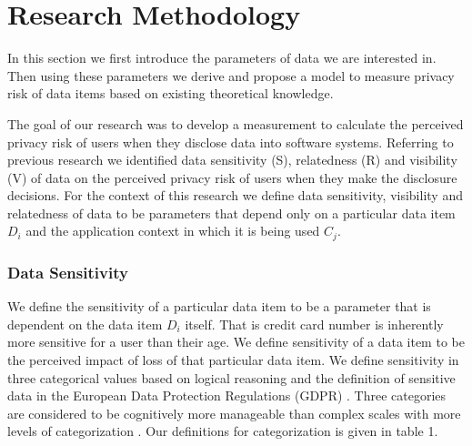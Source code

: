 \documentclass[10pt]{article}
\begin{document}
\section {Research Methodology}

In this section we first introduce the parameters of data we are interested in. Then using these parameters we derive and propose a model to measure privacy risk of data items based on existing theoretical knowledge.

The goal of our research was to develop a measurement to calculate the perceived privacy risk of users when they disclose data into software systems. Referring to previous research we identified data sensitivity (S), relatedness (R) and visibility (V) of data on the perceived privacy risk of users when they make the disclosure decisions. For the context of this research we define data sensitivity, visibility and relatedness of data to be parameters that depend only on a particular data item \textit{$D_i$} and the application context in which it is being used \textit{$C_j$}. 

\subsubsection{Data Sensitivity} 

We define the sensitivity of a particular data item to be a parameter that is dependent on the data item \textit{$D_i$} itself. That is credit card number is inherently more sensitive for a user than their age. We define sensitivity of a data item to be the perceived impact of loss of that particular data item. We define sensitivity in three categorical values based on logical reasoning and the definition of sensitive data in the European Data Protection Regulations (GDPR) \cite {wagner2016national}. Three categories are considered to be cognitively more manageable than complex scales with more levels of categorization \cite {oetzel2014systematic}. Our definitions for categorization is given in table 1.
\end{document}

